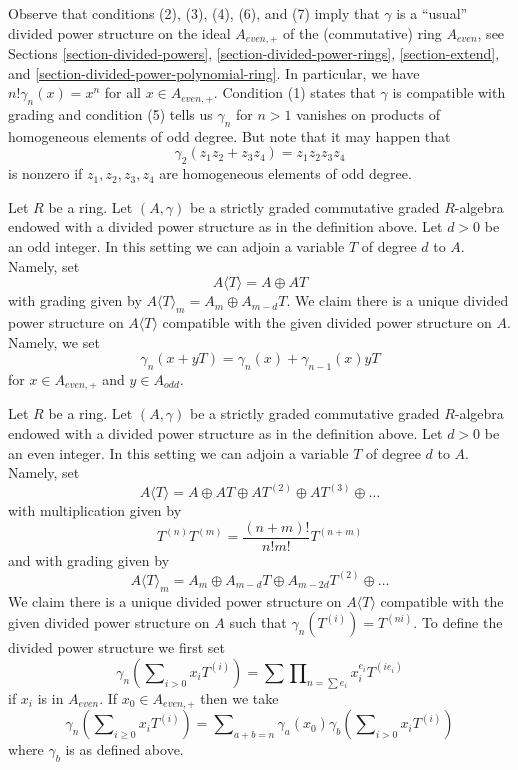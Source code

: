 \noindent
Observe that conditions (2), (3), (4), (6), and (7) imply that
$\gamma$ is a ``usual'' divided power structure on the ideal
$A_{even, +}$ of the (commutative) ring $A_{even}$, see
Sections \ref{section-divided-powers},
\ref{section-divided-power-rings},
\ref{section-extend}, and
\ref{section-divided-power-polynomial-ring}.
In particular, we have $n! \gamma_n(x) = x^n$ for all $x \in A_{even, +}$.
Condition (1) states that $\gamma$ is compatible with grading and condition
(5) tells us $\gamma_n$ for $n > 1$ vanishes on products
of homogeneous elements of odd degree. But note that it may happen
that
$$
\gamma_2(z_1 z_2 + z_3 z_4) = z_1z_2z_3z_4
$$
is nonzero if $z_1, z_2, z_3, z_4$ are homogeneous elements of odd degree.

\begin{example}
\label{example-adjoining-odd}
Let $R$ be a ring. Let $(A, \gamma)$ be a strictly graded commutative
graded $R$-algebra endowed with a divided power structure as in the
definition above. Let $d > 0$ be an odd integer.
In this setting we can adjoin a variable $T$ of degree $d$ to $A$.
Namely, set
$$
A\langle T \rangle = A \oplus AT
$$
with grading given by $A\langle T \rangle_m = A_m \oplus A_{m - d}T$.
We claim there is a unique divided power structure on
$A\langle T \rangle$ compatible with the given divided power
structure on $A$. Namely, we set
$$
\gamma_n(x + yT) = \gamma_n(x) + \gamma_{n - 1}(x)yT
$$
for $x \in A_{even, +}$ and $y \in A_{odd}$.
\end{example}

\begin{example}
\label{example-adjoining-even}
Let $R$ be a ring. Let $(A, \gamma)$ be a strictly graded commutative
graded $R$-algebra endowed with a divided power structure as in the
definition above. Let $d > 0$ be an even integer.
In this setting we can adjoin a variable $T$ of degree $d$ to $A$.
Namely, set
$$
A\langle T \rangle = A \oplus AT \oplus AT^{(2)} \oplus AT^{(3)} \oplus \ldots
$$
with multiplication given by
$$
T^{(n)} T^{(m)} = \frac{(n + m)!}{n!m!} T^{(n + m)}
$$
and with grading given by
$$
A\langle T \rangle_m =
A_m \oplus A_{m - d}T \oplus A_{m - 2d}T^{(2)} \oplus \ldots
$$
We claim there is a unique divided power structure on
$A\langle T \rangle$ compatible with the given divided power
structure on $A$ such that $\gamma_n(T^{(i)}) = T^{(ni)}$.
To define the divided power structure we first set
$$
\gamma_n\left(\sum\nolimits_{i > 0} x_i T^{(i)}\right) =
\sum \prod\nolimits_{n = \sum e_i} x_i^{e_i} T^{(ie_i)}
$$
if $x_i$ is in $A_{even}$. If $x_0 \in A_{even, +}$
then we take
$$
\gamma_n\left(\sum\nolimits_{i \geq 0} x_i T^{(i)}\right) =
\sum\nolimits_{a + b = n}
\gamma_a(x_0)\gamma_b\left(\sum\nolimits_{i > 0} x_iT^{(i)}\right)
$$
where $\gamma_b$ is as defined above.
\end{example}

